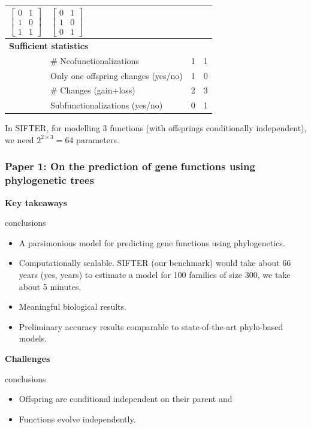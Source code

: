 \documentclass[aspectratio=169, 9pt]{beamer}
\begin{document}
\begin{frame}[t]
{\begin{table}
\begin{tabular}{llcc}
				$\left[\begin{array}{cc} %
				0 & 1 \\ %
				1 & 0 \\ %
				1 & 1 %
				\end{array}\right]$ & 
				$\left[\begin{array}{cc} %
				0 & 1 \\ %
				1 & 0\\ %
				0 & 1%
				\end{array}\right]$ \\ \midrule 
				\multicolumn{3}{l}{\textbf{Sufficient statistics}} \\ 
				& \# Neofunctionalizations & 1 & 1  \\
				& Only one offspring changes (yes/no) & 1 & 0 \\
				& \# Changes (gain+loss) & 2 & 3 \\
				& Subfunctionalizations (yes/no) & 0 & 1 \\ \bottomrule
			\end{tabular}
		\end{table}
	}
	
	\pause
	In SIFTER, for modelling 3 functions (with offsprings conditionally independent), we need $2^{2\times 3} = 64$ parameters.
	
\end{frame}


\begin{frame}[t]
\frametitle{Paper 1: On the prediction of gene functions using phylogenetic trees}

{\bf \large Key takeaways}
\begin{beamercolorbox}[dp=1ex]{conclusions}
\begin{itemize}
\item A parsimonious model for predicting gene functions using phylogenetics.
\item Computationally scalable. SIFTER (our benchmark)
would take about 66 years (yes, years) to estimate a model for 100 families
of size 300, we take about 5 minutes.
\item Meaningful biological results.
\item Preliminary accuracy results comparable to state-of-the-art phylo-based models.
\end{itemize}
\end{beamercolorbox}\pause

{\bf \large Challenges}
\begin{beamercolorbox}[dp=1ex]{conclusions}
\begin{itemize}
\item Offspring are conditional independent on their parent and\pause{}
\item Functions evolve independently. \hyperlink{duplicationvsspeciation}{}
\end{itemize}
\end{beamercolorbox}

\end{frame}
\end{document}

